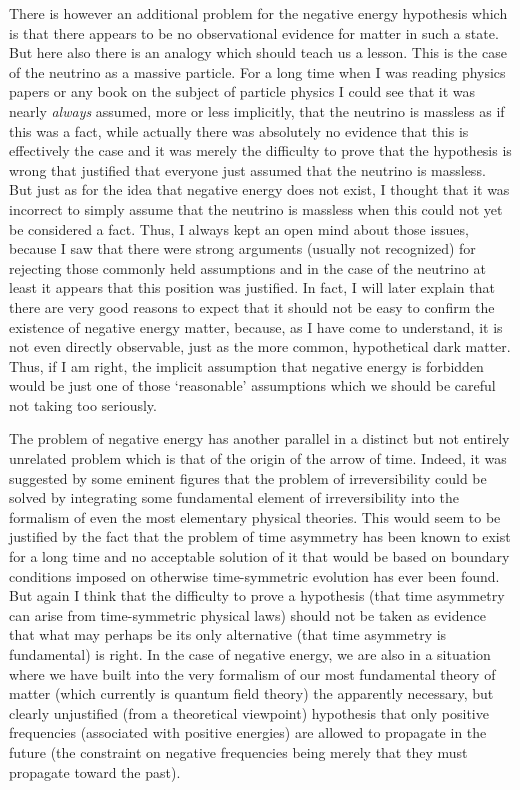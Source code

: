 \documentclass[notitlepage,12pt]{report}
\begin{document}
There is however an additional problem for the negative energy hypothesis which is that there appears to be no observational evidence for matter in such a state. But here also there is an analogy which should teach us a lesson. This is the case of the neutrino as a massive particle. For a long time when I was reading physics papers or any book on the subject of particle physics I could see that it was nearly \textit{always} assumed, more or less implicitly, that the neutrino is massless as if this was a fact, while actually there was absolutely no evidence that this is effectively the case and it was merely the difficulty to prove that the hypothesis is wrong that justified that everyone just assumed that the neutrino is massless. But just as for the idea that negative energy does not exist, I thought that it was incorrect to simply assume that the neutrino is massless when this could not yet be considered a fact. Thus, I always kept an open mind about those issues, because I saw that there were strong arguments (usually not recognized) for rejecting those commonly held assumptions and in the case of the neutrino at least it appears that this position was justified. In fact, I will later explain that there are very good reasons to expect that it should not be easy to confirm the existence of negative energy matter, because, as I have come to understand, it is not even directly observable, just as the more common, hypothetical dark matter. Thus, if I am right, the implicit assumption that negative energy is forbidden would be just one of those `reasonable' assumptions which we should be careful not taking too seriously.

The problem of negative energy has another parallel in a distinct but not entirely unrelated problem which is that of the origin of the arrow of time. Indeed, it was suggested by some eminent figures that the problem of irreversibility could be solved by integrating some fundamental element of irreversibility into the formalism of even the most elementary physical theories. This would seem to be justified by the fact that the problem of time asymmetry has been known to exist for a long time and no acceptable solution of it that would be based on boundary conditions imposed on otherwise time-symmetric evolution has ever been found. But again I think that the difficulty to prove a hypothesis (that time asymmetry can arise from time-symmetric physical laws) should not be taken as evidence that what may perhaps be its only alternative (that time asymmetry is fundamental) is right. In the case of negative energy, we are also in a situation where we have built into the very formalism of our most fundamental theory of matter (which currently is quantum field theory) the apparently necessary, but clearly unjustified (from a theoretical viewpoint) hypothesis that only positive frequencies (associated with positive energies) are allowed to propagate in the future (the constraint on negative frequencies being merely that they must propagate toward the past).
\end{document}
